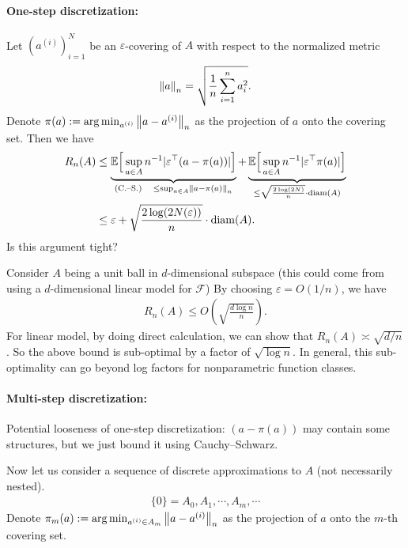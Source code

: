 \documentclass[11pt,letterpaper]{article}
\numberwithin{theorem}{lecture}
\numberwithin{proposition}{lecture}
\numberwithin{lemma}{lecture}
\numberwithin{claim}{lecture}
\numberwithin{corollary}{lecture}
\numberwithin{definition}{lecture}
\numberwithin{conjecture}{lecture}
\numberwithin{remark}{lecture}
\numberwithin{example}{lecture}
\numberwithin{equation}{lecture}
\begin{document}
\paragraph{One-step discretization:}
Let $(a^{(i)})_{i = 1}^N$ be an $\varepsilon$-covering of $A$ with respect to the normalized metric
\begin{align*}
  \left\| a\right\|_{n} = \sqrt{\frac{1}{n} \sum_{i = 1}^n a_i^2}.
\end{align*}
Denote $\pi (a) := \arg\min_{a^{(i)}} \left\| a - a^{(i)}\right\|_{n}$ as the projection of $a$ onto the covering set. Then we have
\begin{align*}
R_n(A) &\leq \underbrace{{\mathbb{E}} \Big[ \sup_{a \in A} n^{-1}|\varepsilon^\top (a - \pi(a))| \Big]}_{(\text{C.--S.})\quad \leq \sup_{a \in A} \left\| a - \pi (a)\right\|_{n}} + \underbrace{{\mathbb{E}} \Big[ \sup_{a \in A} n^{-1}|\varepsilon^\top \pi(a)| \Big] }_{\leq \sqrt{\frac{2\log (2 N)}{n}} \cdot \mathrm{diam} (A)}\\
&\leq \varepsilon + \sqrt{\frac{2\log (2 N (\varepsilon))}{n}} \cdot \mathrm{diam} (A).
\end{align*}
Is this argument tight?

Consider $A$ being a unit ball in $d$-dimensional subspace (this could come from using a $d$-dimensional linear model for $\mathcal{F}$) By choosing $\varepsilon = O (1/n)$, we have
\begin{align*}
  R_n (A) \leq O (\sqrt{\frac{d \log n }{ n}}).
\end{align*}
For linear model, by doing direct calculation, we can show that $R_n (A) \asymp \sqrt{d / n}$. So the above bound is sub-optimal by a factor of $\sqrt{\log n}$. In general, this sub-optimality can go beyond log factors for nonparametric function classes.

\paragraph{Multi-step discretization:} Potential looseness of one-step discretization: $(a - \pi (a))$ may contain some structures, but we just bound it using Cauchy--Schwarz.

Now let us consider a sequence of discrete approximations to $A$ (not necessarily nested).
\begin{align*}
  \{0\} = A_0, A_1, \cdots, A_m, \cdots
\end{align*}
Denote $\pi_m (a) := \arg\min_{a^{(i)} \in A_m} \left\| a - a^{(i)}\right\|_{n}$ as the projection of $a$ onto the $m$-th covering set.
\end{document}

